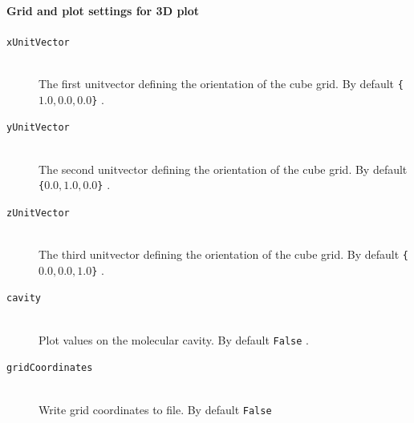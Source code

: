 \documentclass[bibliography=totocnumbered,a4paper,10pt,oneside]{scrbook}
\newcommand{\ttt}[1]{%
  \begingroup\setlength{\fboxsep}{1pt}%
  \colorbox{serenity-green!30}{\texttt{\hspace*{2pt}\vphantom{(g}#1\hspace*{2pt}}}%
  \endgroup
}
\begin{document}
\paragraph{Grid and plot settings for 3D plot}
\begin{description}
    \item [\texttt{xUnitVector}]\hfill \\
    The first unitvector defining the orientation of the cube grid. By default \ttt{\{$1.0, 0.0, 0.0$\}}.
    \item [\texttt{yUnitVector}]\hfill \\
    The second unitvector defining the orientation of the cube grid. By default \ttt{\{$0.0, 1.0, 0.0$\}}.
    \item [\texttt{zUnitVector}]\hfill \\
    The third unitvector defining the orientation of the cube grid. By default \ttt{\{$0.0, 0.0, 1.0$\}}.
    \item [\texttt{cavity}]\hfill \\
    Plot values on the molecular cavity. By default \ttt{False}.
    \item [\texttt{gridCoordinates}]\hfill \\
    Write grid coordinates to file. By default \ttt{False}
\end{description}
\end{document}

